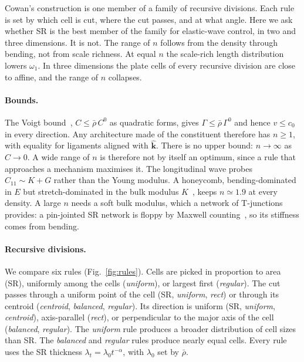 \documentclass[aps,prl,twocolumn,superscriptaddress,amsmath,amssymb,floatfix]{revtex4-2}
\begin{document}
Cowan's construction is one member of a family of recursive divisions. Each rule is set
by which cell is cut, where the cut passes, and at what angle. Here we ask whether SR is
the best member of the family for elastic-wave control, in two and three dimensions. It
is not. The range of $n$ follows from the density through bending, not from scale
richness. At equal $n$ the scale-rich length distribution lowers $\omega_1$. In three
dimensions the plate cells of every recursive division are close to affine, and the
range of $n$ collapses.

\paragraph*{Bounds.}
The Voigt bound~\cite{hill1952}, $C\le\bar\rho\,C^{0}$ as quadratic forms, gives
$\Gamma\le\bar\rho\,\Gamma^{0}$ and hence $v\le c_0$ in every direction. Any architecture
made of the constituent therefore has $n\ge1$, with equality for ligaments aligned with
$\hat{\bm k}$. There is no
upper bound: $n\to\infty$ as $C\to0$. A wide range of $n$ is therefore not by itself an
optimum, since a rule that approaches a mechanism maximises it. The longitudinal wave
probes $C_{11}\sim K+G$ rather than the Young modulus. A honeycomb, bending-dominated in
$E$ but stretch-dominated in the bulk modulus $K$~\cite{deshpande2001}, keeps
$n\simeq1.9$ at every density. A large $n$ needs a soft bulk modulus, which a network
of T-junctions provides: a pin-jointed SR network is floppy by Maxwell
counting~\cite{maxwell1864,vazquez2026sr}, so its stiffness comes from bending.

\paragraph*{Recursive divisions.}
We compare six rules (Fig.~\ref{fig:rules}). Cells are picked in proportion to area
(SR), uniformly among the cells (\emph{uniform}), or largest first (\emph{regular}). The
cut passes through a uniform point of the cell (SR, \emph{uniform}, \emph{rect}) or
through its centroid (\emph{centroid}, \emph{balanced}, \emph{regular}). Its direction is
uniform (SR, \emph{uniform}, \emph{centroid}), axis-parallel (\emph{rect}), or
perpendicular to the major axis of the cell (\emph{balanced}, \emph{regular}). The
\emph{uniform} rule produces a broader distribution of cell sizes than SR. The
\emph{balanced} and \emph{regular} rules produce nearly equal cells. Every rule uses the
SR thickness $\lambda_t=\lambda_0t^{-\alpha}$, with $\lambda_0$ set by $\bar\rho$.
\end{document}
